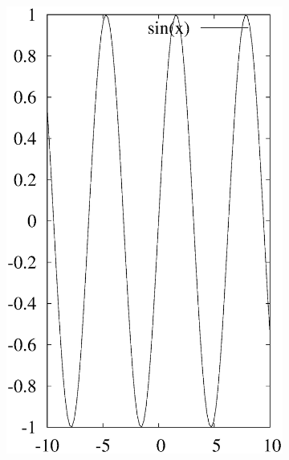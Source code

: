 \documentclass[letterpaper,showpacs,prb,preprint]{revtex4}
\begin{document}
\begin{figure}[ht]
\begin{subfigure}{0.3\textwidth}
\includegraphics [width=\textwidth]{sin.eps}

\end{subfigure}
\end{figure}
\end{document}
